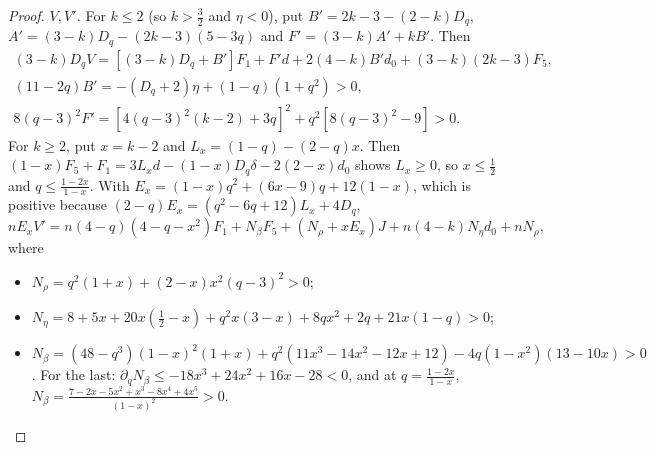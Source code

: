 \documentclass[11pt,a4paper]{article}
\numberwithin{equation}{section}
\theoremstyle{definition}
\begin{document}
\begin{proof}
\emph{$V,V'$.} For $k\le2$ (so $k>\frac32$ and $\eta<0$), put
$B'=2k-3-(2-k)D_q$, $A'=(3-k)D_q-(2k-3)(5-3q)$ and $F'=(3-k)A'+kB'$. Then
\begin{gather*}
(3-k)D_qV=[(3-k)D_q+B']F_1+F'd+2(4-k)B'd_0+(3-k)(2k-3)F_5,\\
(11-2q)B'=-(D_q+2)\eta+(1-q)(1+q^2)>0,\\
8(q-3)^2F'=[4(q-3)^2(k-2)+3q]^2+q^2[8(q-3)^2-9]>0 .
\end{gather*}
For $k\ge2$, put $x=k-2$ and $L_x=(1-q)-(2-q)x$. Then
$(1-x)F_5+F_1=3L_xd-(1-x)D_q\delta-2(2-x)d_0$ shows $L_x\ge0$, so
$x\le\frac12$ and $q\le\frac{1-2x}{1-x}$. With
$E_x=(1-x)q^2+(6x-9)q+12(1-x)$, which is positive because
$(2-q)E_x=(q^2-6q+12)L_x+4D_q$,
\[
nE_xV'=n(4-q)(4-q-x^2)F_1+N_\beta F_5+(N_\rho+xE_x)J+n(4-k)N_\eta d_0+nN_\rho,
\]
where
\begin{itemize}
\item $N_\rho=q^2(1+x)+(2-x)x^2(q-3)^2>0$;
\item $N_\eta=8+5x+20x(\frac12-x)+q^2x(3-x)+8qx^2+2q+21x(1-q)>0$;
\item $N_\beta=(48-q^3)(1-x)^2(1+x)+q^2(11x^3-14x^2-12x+12)-4q(1-x^2)(13-10x)>0$.
For the last: $\partial_qN_\beta\le-18x^3+24x^2+16x-28<0$, and at
$q=\frac{1-2x}{1-x}$, $N_\beta=\frac{7-2x-5x^2+x^3-8x^4+4x^5}{(1-x)^2}>0$.
\end{itemize}


\end{proof}
\end{document}
